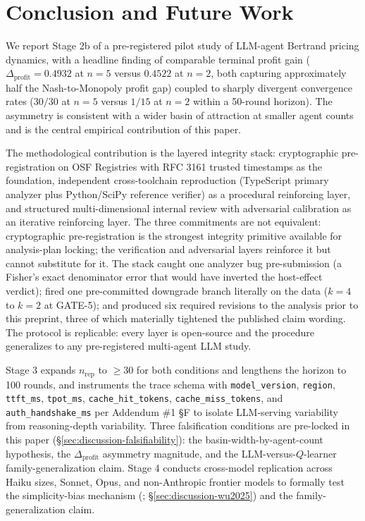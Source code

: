 \section{Conclusion and Future Work}
\label{sec:conclusion}

We report Stage 2b of a pre-registered pilot study of LLM-agent Bertrand pricing dynamics, with a headline finding of comparable terminal profit gain ($\Delta_{\text{profit}} = 0.4932$ at $n = 5$ versus $0.4522$ at $n = 2$, both capturing approximately half the Nash-to-Monopoly profit gap) coupled to sharply divergent convergence rates ($30/30$ at $n = 5$ versus $1/15$ at $n = 2$ within a 50-round horizon). The asymmetry is consistent with a wider basin of attraction at smaller agent counts and is the central empirical contribution of this paper.

The methodological contribution is the layered integrity stack: cryptographic pre-registration on OSF Registries with RFC 3161 trusted timestamps as the foundation, independent cross-toolchain reproduction (TypeScript primary analyzer plus Python/SciPy reference verifier) as a procedural reinforcing layer, and structured multi-dimensional internal review with adversarial calibration as an iterative reinforcing layer. The three commitments are not equivalent: cryptographic pre-registration is the strongest integrity primitive available for analysis-plan locking; the verification and adversarial layers reinforce it but cannot substitute for it. The stack caught one analyzer bug pre-submission (a Fisher's exact denominator error that would have inverted the host-effect verdict); fired one pre-committed downgrade branch literally on the data ($k = 4$ to $k = 2$ at GATE-5); and produced six required revisions to the analysis prior to this preprint, three of which materially tightened the published claim wording. The protocol is replicable: every layer is open-source and the procedure generalizes to any pre-registered multi-agent LLM study.

Stage 3 expands $n_{\text{rep}}$ to $\geq 30$ for both conditions and lengthens the horizon to 100 rounds, and instruments the trace schema with \texttt{model\_version}, \texttt{region}, \texttt{ttft\_ms}, \texttt{tpot\_ms}, \texttt{cache\_hit\_tokens}, \texttt{cache\_miss\_tokens}, and \texttt{auth\_handshake\_ms} per Addendum \#1 \S F to isolate LLM-serving variability from reasoning-depth variability. Three falsification conditions are pre-locked in this paper (\S\ref{sec:discussion-falsifiability}): the basin-width-by-agent-count hypothesis, the $\Delta_{\text{profit}}$ asymmetry magnitude, and the LLM-versus-$Q$-learner family-generalization claim. Stage 4 conducts cross-model replication across Haiku sizes, Sonnet, Opus, and non-Anthropic frontier models to formally test the simplicity-bias mechanism (\citealp{wu2025whenMoreIsLess}; \S\ref{sec:discussion-wu2025}) and the family-generalization claim.

